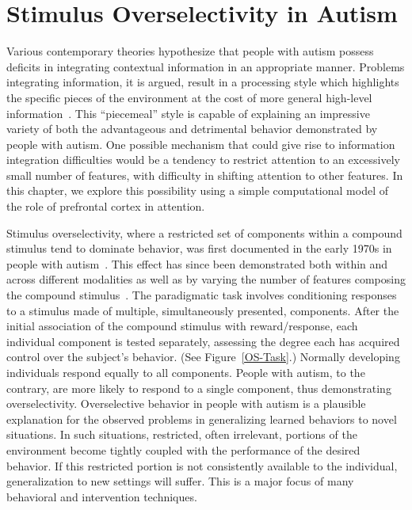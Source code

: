 \documentclass[man]{apa}
\begin{document}
\section{Stimulus Overselectivity in Autism}
Various contemporary theories hypothesize that people with autism possess deficits in integrating contextual information in an appropriate manner.  Problems integrating information, it is argued, result in a processing style which highlights the specific pieces of the environment at the cost of more general high-level information~\cite{HappeF:1999:WCC}. This ``piecemeal'' style is capable of explaining an impressive variety of both the advantageous and detrimental behavior demonstrated by people with autism.  One possible mechanism that could give rise to information integration difficulties would be a tendency to restrict attention to an excessively small number of features, with difficulty in shifting attention to other features.  In this chapter, we explore this possibility using a simple computational model of the role of prefrontal cortex in attention.

Stimulus overselectivity, where a restricted set of components within a compound stimulus tend to dominate behavior, was first documented in the early 1970s in people with autism~\cite{RefWorks:110}.  This effect has since been demonstrated both within and across different modalities as well as by varying the number of features composing the compound stimulus~\cite{RefWorks:112}.  The paradigmatic task involves conditioning responses to a stimulus made of multiple, simultaneously presented, components.  After the initial association of the compound stimulus with reward/response, each individual component is tested separately, assessing the degree each has acquired control over the subject's behavior. (See Figure~\ref{OS-Task}.)  Normally developing individuals respond equally to all components.  People with autism, to the contrary, are more likely to respond to a single component, thus demonstrating overselectivity.  Overselective behavior in people with autism is a plausible explanation for the observed problems in generalizing learned behaviors to novel situations.  In such situations, restricted, often irrelevant, portions of the environment become tightly coupled with the performance of the desired behavior.  If this restricted portion is not consistently available to the individual, generalization to new settings will suffer.  This is a major focus of many behavioral and intervention techniques. 
\end{document}
